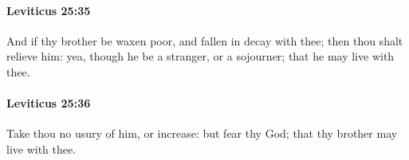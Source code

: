 		\paragraph{Leviticus 25:35} %
			\label{LEVITICUS-25-35}

			And if thy brother be waxen poor, and fallen in decay with thee; then thou shalt relieve him: yea, though he be a stranger, or a sojourner; that he may live with thee.


		\paragraph{Leviticus 25:36} %
			\label{LEVITICUS-25-36}

			Take thou no usury of him, or increase: but fear thy God; that thy brother may live with thee.


